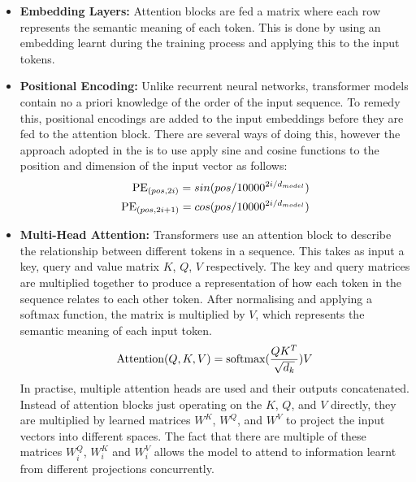 \documentclass[12pt,twoside]{report}
\begin{document}
\begin{itemize}
  \item \textbf{Embedding Layers:} 
    Attention blocks are fed a matrix where each row represents the semantic meaning of each token. This is done by using an embedding learnt during the training process and applying this to the input tokens.
  \item \textbf{Positional Encoding:} 
    Unlike recurrent neural networks, transformer models contain no a priori knowledge of the order of the input sequence.
    To remedy this, positional encodings are added to the input embeddings before they are fed to the attention block.
    There are several ways of doing this, however the approach adopted in the \cite{vaswani2017attention} is to use apply sine and cosine functions to the position and dimension of the input vector as follows:
    \begin{equation*}
      \begin{split}
        \textnormal{PE}_{(pos, 2i)} = sin(pos/10000^{2i/d_{model}}) \\ 
        \textnormal{PE}_{(pos, 2i+1)} = cos(pos/10000^{2i/d_{model}})
      \end{split}
    \end{equation*}
  \item \textbf{Multi-Head Attention:}
    Transformers use an attention block to describe the relationship between different tokens in a sequence. 
    This takes as input a key, query and value matrix $K$, $Q$, $V$ respectively. 
    The key and query matrices are multiplied together to produce a representation of how each token in the sequence relates to each other token.
    After normalising and applying a softmax function, the matrix is multiplied by $V$, which represents the semantic meaning of each input token.
    \begin{equation*}
      \textnormal{Attention}(Q,K,V) = \textnormal{softmax}(\frac{QK^T}{\sqrt{d_k}})V
    \end{equation*}
    In practise, multiple attention heads are used and their outputs concatenated.  
    Instead of attention blocks just operating on the $K$, $Q$, and $V$ directly, they are multiplied by learned matrices $W^K$, $W^Q$, and $W^V$ to project the input vectors into different spaces.
    The fact that there are multiple of these matrices $W_i^Q$, $W_i^K$ and $W_i^V$ allows the model to attend to information learnt from different projections concurrently.
    \begin{equation*}
      \begin{split}

\end{split}
\end{equation*}
\end{itemize}
\end{document}

